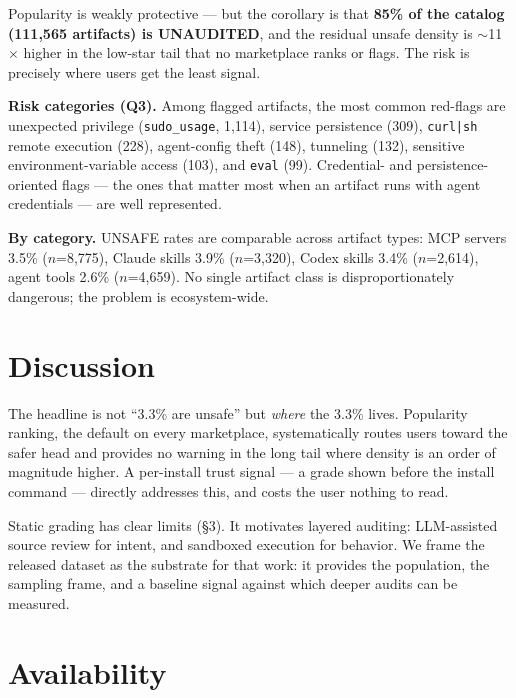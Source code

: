 \documentclass[11pt]{article}
\begin{document}
Popularity is weakly protective --- but the corollary is that \textbf{85\% of
the catalog (111,565 artifacts) is UNAUDITED}, and the residual unsafe
density is $\sim$11$\times$ higher in the low-star tail that no marketplace
ranks or flags. The risk is precisely where users get the least signal.

\textbf{Risk categories (Q3).} Among flagged artifacts, the most common
red-flags are unexpected privilege (\texttt{sudo\_usage}, 1,114), service
persistence (309), \texttt{curl|sh} remote execution (228), agent-config
theft (148), tunneling (132), sensitive environment-variable access (103),
and \texttt{eval} (99). Credential- and persistence-oriented flags --- the
ones that matter most when an artifact runs with agent credentials --- are
well represented.

\textbf{By category.} UNSAFE rates are comparable across artifact types: MCP
servers 3.5\% ($n$=8,775), Claude skills 3.9\% ($n$=3,320), Codex skills
3.4\% ($n$=2,614), agent tools 2.6\% ($n$=4,659). No single artifact class is
disproportionately dangerous; the problem is ecosystem-wide.

\section{Discussion}

The headline is not ``3.3\% are unsafe'' but \emph{where} the 3.3\% lives.
Popularity ranking, the default on every marketplace, systematically routes
users toward the safer head and provides no warning in the long tail where
density is an order of magnitude higher. A per-install trust signal --- a
grade shown before the install command --- directly addresses this, and costs
the user nothing to read.

Static grading has clear limits (\S3). It motivates layered auditing:
LLM-assisted source review for intent, and sandboxed execution for behavior.
We frame the released dataset as the substrate for that work: it provides the
population, the sampling frame, and a baseline signal against which deeper
audits can be measured.

\section{Availability}
\end{document}
